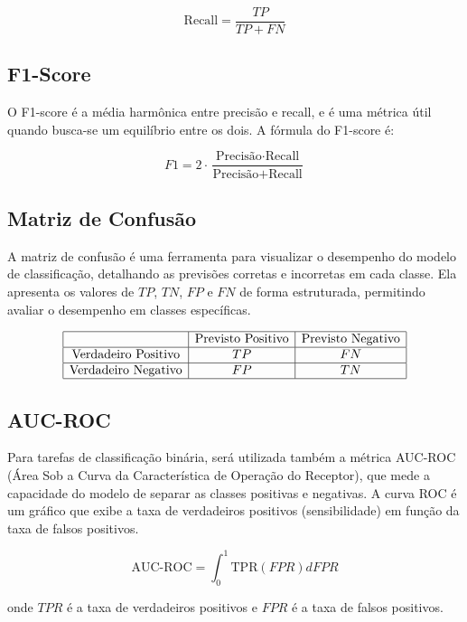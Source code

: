 \begin{equation}
    \text{Recall} = \frac{TP}{TP + FN}
\end{equation}

\subsection{F1-Score}
O F1-score é a média harmônica entre precisão e recall, e é uma métrica útil quando busca-se um equilíbrio entre os dois. A fórmula do F1-score é:

\begin{equation}
    F1 = 2 \cdot \frac{\text{Precisão} \cdot \text{Recall}}{\text{Precisão} + \text{Recall}}
\end{equation}

\subsection{Matriz de Confusão}
A matriz de confusão é uma ferramenta para visualizar o desempenho do modelo de classificação, detalhando as previsões corretas e incorretas em cada classe. Ela apresenta os valores de $TP$, $TN$, $FP$ e $FN$ de forma estruturada, permitindo avaliar o desempenho em classes específicas.

\[
\begin{array}{|c|c|c|}
\hline
 & \text{Previsto Positivo} & \text{Previsto Negativo} \\
\hline
\text{Verdadeiro Positivo} & TP & FN \\
\hline
\text{Verdadeiro Negativo} & FP & TN \\
\hline
\end{array}
\]

\subsection{AUC-ROC}
Para tarefas de classificação binária, será utilizada também a métrica AUC-ROC (Área Sob a Curva da Característica de Operação do Receptor), que mede a capacidade do modelo de separar as classes positivas e negativas. A curva ROC é um gráfico que exibe a taxa de verdadeiros positivos (sensibilidade) em função da taxa de falsos positivos.

\begin{equation}
    \text{AUC-ROC} = \int_{0}^{1} \text{TPR}(FPR) dFPR
\end{equation}

onde $TPR$ é a taxa de verdadeiros positivos e $FPR$ é a taxa de falsos positivos.


